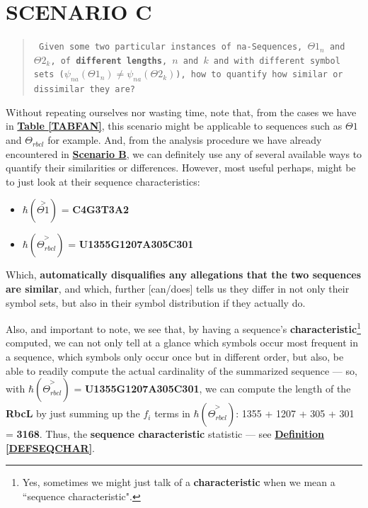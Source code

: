 \documentclass[a4paper, 18pt]{book} %
\begin{document}
\section{SCENARIO C}
\label{SECSCENC}

\begin{quote}
\small
\texttt{
Given some two particular instances of na-Sequences, $\Theta1_n$ and $\Theta2_k$, of \textbf{different lengths}, $n$ and $k$ and with different symbol sets ($\psi_{na}(\Theta1_n) \neq \psi_{na}(\Theta2_k)$), how to quantify how similar or dissimilar they are?}
\end{quote}

Without repeating ourselves nor wasting time, note that, from the cases we have in \textbf{\hyperref[TABFAN]{Table \ref{TABFAN}}}, this scenario might be applicable to sequences such as $\Theta1$ and $\Theta_{rbcl}$ for example. And, from the analysis procedure we have already encountered in \textbf{\hyperref[SECSCENB]{Scenario B}}, we can definitely use any of several available ways to quantify their similarities or differences. However, most useful perhaps, might be to just look at their sequence characteristics:

\begin{itemize}
\item $\hbar(\overset{>}{\Theta1})$ = \textbf{C4G3T3A2}
\item $\hbar(\overset{>}{\Theta_{rbcl}})$ = \textbf{U1355G1207A305C301}
\end{itemize}

Which, \textbf{automatically disqualifies any allegations that the two sequences are similar}, and which, further [can/does] tells us they differ in not only their symbol sets, but also in their symbol distribution if they actually do.

Also, and important to note, we see that, by having a sequence's \textbf{characteristic}\footnote{Yes, sometimes we might just talk of a \textbf{characteristic} when we mean a ``sequence characteristic".} computed, we can not only tell at a glance which symbols occur most frequent in a sequence, which symbols only occur once but in different order, but also, be able to readily compute the actual cardinality of the summarized sequence --- so, with $\hbar(\overset{>}{\Theta_{rbcl}})$ = \textbf{U1355G1207A305C301}, we can compute the length of the \textbf{RbcL} by just summing up the $f_i$ terms in $\hbar(\overset{>}{\Theta_{rbcl}})$: 1355 + 1207 + 305 + 301 = \textbf{3168}. Thus, the \textbf{sequence characteristic} statistic --- see \textbf{\hyperref[DEFSEQCHAR]{Definition \ref{DEFSEQCHAR}}}. 
\end{document}

